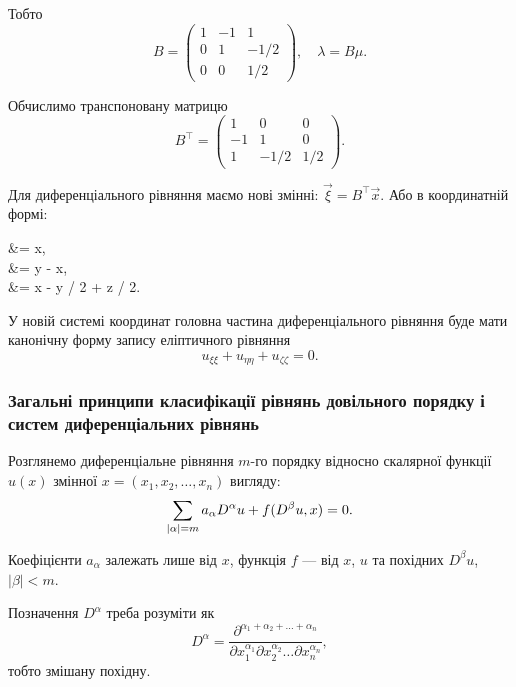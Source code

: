 \begin{solution}
	Тобто
	\begin{equation*}
		B = \begin{pmatrix} 
			1 & -1 & 1 \\
			0 & 1 & -1/2 \\
			0 & 0 & 1/2
		\end{pmatrix}, \quad \lambda = B \mu.
	\end{equation*}

	Обчислимо транспоновану матрицю
	\begin{equation*}
		B^\intercal = \begin{pmatrix} 
			1 & 0 & 0 \\
			-1 & 1 & 0 \\
			1 & -1/2 & 1/2
		\end{pmatrix}.
	\end{equation*}

	Для диференціального рівняння маємо нові змінні: $\vec \xi = B^\intercal \vec x$. Або в координатній формі:
	\begin{system*}
		\xi &= x, \\
		\eta &= y - x, \\
		\zeta &= x - y / 2 + z / 2.
	\end{system*}

	У новій системі координат головна частина диференціального рівняння буде мати канонічну форму запису еліптичного рівняння
	\begin{equation*}
		u_{\xi\xi} + u_{\eta\eta} + u_{\zeta\zeta} = 0.
	\end{equation*}
\end{solution}

\subsubsection{Загальні принципи класифікації рівнянь довільного порядку і систем диференціальних рівнянь}

Розглянемо диференціальне рівняння $m$-го порядку відносно скалярної функції $u(x)$ змінної $x = (x_1, x_2, \ldots, x_n)$ вигляду:
\begin{equation}
	\displaystyle\sum\limits_{|\alpha|=m}a_\alpha D^\alpha u + f(D^\beta u, x) = 0.
\end{equation}

Коефіцієнти $a_\alpha$ залежать лише від $x$, функція $f$ --- від $x$, $u$ та похідних $D^\beta u$, $|\beta| < m$. 

\begin{remark}
	Позначення $D^\alpha$ треба розуміти як
	\begin{equation}
		D^\alpha = \frac{\partial^{\alpha_1+\alpha_2+\ldots+\alpha_n}}{\partial x_1^{\alpha_1}\partial x_2^{\alpha_2}\ldots\partial x_n^{\alpha_n}},
	\end{equation}
	тобто змішану похідну. 
\end{remark}

